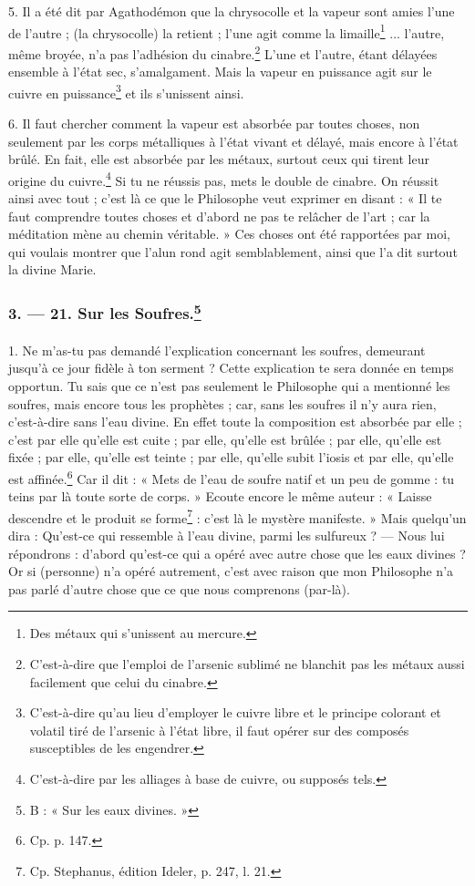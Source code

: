 \documentclass[a4paper, 11pt, oneside, polutonikogreek, french]{article}
\begin{document}
5. Il a été dit par Agathodémon que la chrysocolle et la vapeur sont amies l'une de l'autre ; (la chrysocolle) la retient ; l'une agit comme la limaille\footnote{Des métaux qui s'unissent au mercure.} ... l'autre, même broyée, n'a pas l'adhésion du cinabre.\footnote{C'est-à-dire que l'emploi de l'arsenic sublimé ne blanchit pas les métaux aussi facilement que celui du cinabre.} L'une et l'autre, étant délayées ensemble à l'état sec, s'amalgament. Mais la vapeur en puissance agit sur le cuivre en puissance\footnote{C'est-à-dire qu'au lieu d'employer le cuivre libre et le principe colorant et volatil tiré de l'arsenic à l'état libre, il faut opérer sur des composés susceptibles de les engendrer.} et ils s'unissent ainsi.

6. Il faut chercher comment la vapeur est absorbée par toutes choses, non seulement par les corps métalliques à l'état vivant et délayé, mais encore à l'état brûlé. En fait, elle est absorbée par les métaux, surtout ceux qui tirent leur origine du cuivre.\footnote{C'est-à-dire par les alliages à base de cuivre, ou supposés tels.} Si tu ne réussis pas, mets le double de cinabre. On réussit ainsi avec tout ; c'est là ce que le Philosophe veut exprimer en disant : « Il te faut comprendre toutes choses et d'abord ne pas te relâcher de l'art ; car la méditation mène au chemin véritable. » Ces choses ont été rapportées par moi, qui voulais montrer que l'alun rond agit semblablement, ainsi que l'a dit surtout la divine Marie.

\bigskip
\centerline{\EightStarTaper}
\centerline{\EightStarTaper\EightStarTaper}
\bigskip

\subsubsection[3. --- 21. Sur les Soufres.]{3. --- 21. Sur les Soufres.\footnote{B : « Sur les eaux divines. »}}
\paragraph{}
1. Ne m'as-tu pas demandé l'explication concernant les soufres, demeurant jusqu'à ce jour fidèle à ton serment ? Cette explication te sera donnée en temps opportun. Tu sais que ce n'est pas seulement le Philosophe qui a mentionné les soufres, mais encore tous les prophètes ; car, sans les soufres il n'y aura rien, c'est-à-dire sans l'eau divine. En effet toute la composition est absorbée par elle ; c'est par elle qu'elle est cuite ; par elle, qu'elle est brûlée ; par elle, qu'elle est fixée ; par elle, qu'elle est teinte ; par elle, qu'elle subit l'iosis et par elle, qu'elle est affinée.\footnote{Cp. p. 147.} Car il dit : « Mets de l'eau de soufre natif et un peu de gomme : tu teins par là toute sorte de corps. » Ecoute encore le même auteur : « Laisse descendre et le produit se forme\footnote{Cp. Stephanus, édition Ideler, p. 247, l. 21.} : c'est là le mystère manifeste. » Mais quelqu'un dira : Qu'est-ce qui ressemble à l'eau divine, parmi les sulfureux ? --- Nous lui répondrons : d'abord qu'est-ce qui a opéré avec autre chose que les eaux divines ? Or si (personne) n'a opéré autrement, c'est avec raison que mon Philosophe n'a pas parlé d'autre chose que ce que nous comprenons (par-là).
\end{document}
